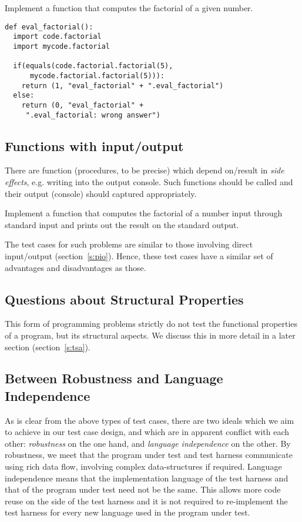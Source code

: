 \documentclass[12pt]{article}
\begin{document}
\begin{mdframed}[frametitle=Example]
Implement a function that computes the factorial of a given number.
\end{mdframed}

\begin{lstlisting}[style=pc]
def eval_factorial():
  import code.factorial
  import mycode.factorial

  if(equals(code.factorial.factorial(5),
      mycode.factorial.factorial(5))):
    return (1, "eval_factorial" + ".eval_factorial")
  else:
    return (0, "eval_factorial" +
     ".eval_factorial: wrong answer")
\end{lstlisting}

\subsection{Functions with input/output}
There are function (procedures, to be precise) which depend on/result in \emph{side effects}, e.g. writing into the output console. Such functions should be called and their output (console) should captured appropriately.


\begin{mdframed}[frametitle=Example]
Implement a function that computes the factorial of a number input through standard input and prints out the result on the standard output.
\end{mdframed}

The test cases for such problems are similar to those involving direct input/output (section~\ref*{s:pio}). Hence, these test cases have a similar set of advantages and disadvantages as those. 

\subsection{Questions about Structural Properties}
This form of programming problems strictly do not test the functional properties of a program, but its structural aspects. We discuss this in more detail in a later section (section~\ref{s:tsa}).

\subsection{Between Robustness and Language Independence}

As is clear from the above types of test cases, there are two ideals which we aim to achieve in our test case design, and which are in apparent conflict with each other: \emph{robustness} on the one hand, and \emph{language independence} on the other. By robustness, we meet that the program under test and test harness communicate using rich data flow, involving complex data-structures if required. Language independence means that the implementation language of the test harness and that of the program under test need not be the same. This allows more code reuse on the side of the test harness and it is not required to re-implement the test harness for every new language used in the program under test.
\end{document}
